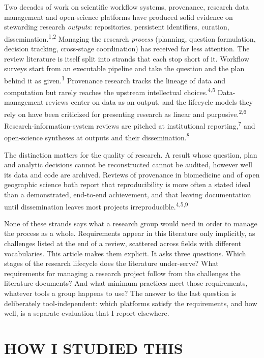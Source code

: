 \documentclass{IEEEcsmag}
\begin{document}
Two decades of work on scientific workflow systems, provenance, research data management and open-science platforms have produced solid evidence on stewarding research \emph{outputs}: repositories, persistent identifiers, curation, dissemination.\textsuperscript{1,2} Managing the research \emph{process} (planning, question formulation, decision tracking, cross-stage coordination) has received far less attention. The review literature is itself split into strands that each stop short of it. Workflow surveys start from an executable pipeline and take the question and the plan behind it as given.\textsuperscript{1} Provenance research tracks the lineage of data and computation but rarely reaches the upstream intellectual choices.\textsuperscript{4,5} Data-management reviews center on data as an output, and the lifecycle models they rely on have been criticized for presenting research as linear and purposive.\textsuperscript{2,6} Research-information-system reviews are pitched at institutional reporting,\textsuperscript{7} and open-science syntheses at outputs and their dissemination.\textsuperscript{8}

The distinction matters for the quality of research. A result whose question, plan and analytic decisions cannot be reconstructed cannot be audited, however well its data and code are archived. Reviews of provenance in biomedicine and of open geographic science both report that reproducibility is more often a stated ideal than a demonstrated, end-to-end achievement, and that leaving documentation until dissemination leaves most projects irreproducible.\textsuperscript{4,5,9}

None of these strands says what a research group would need in order to manage the process as a whole. Requirements appear in this literature only implicitly, as challenges listed at the end of a review, scattered across fields with different vocabularies. This article makes them explicit. It asks three questions. Which stages of the research lifecycle does the literature under-serve? What requirements for managing a research project follow from the challenges the literature documents? And what minimum practices meet those requirements, whatever tools a group happens to use? The answer to the last question is deliberately tool-independent: which platforms satisfy the requirements, and how well, is a separate evaluation that I report elsewhere.

\section{HOW I STUDIED THIS}
\end{document}
